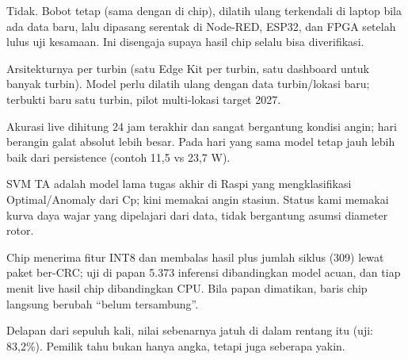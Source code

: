 \documentclass[10.5pt,a4paper]{article}
\begin{document}
\begin{jawab}
Tidak. Bobot tetap (sama dengan di chip), dilatih ulang terkendali di laptop bila ada data baru, lalu dipasang serentak di Node-RED, ESP32, dan FPGA
setelah lulus uji kesamaan. Ini disengaja supaya hasil chip selalu bisa diverifikasi.
\end{jawab}
\begin{jawab}
Arsitekturnya per turbin (satu Edge Kit per turbin, satu dashboard untuk banyak turbin). Model perlu dilatih ulang dengan data turbin/lokasi
baru; terbukti baru satu turbin, pilot multi-lokasi target 2027.
\end{jawab}
\begin{jawab}
Akurasi live dihitung 24 jam terakhir dan sangat bergantung kondisi angin; hari berangin galat absolut lebih besar. Pada hari yang sama model
tetap jauh lebih baik dari persistence (contoh 11,5 vs 23,7 W).
\end{jawab}
\begin{jawab}
SVM TA adalah model lama tugas akhir di Raspi yang mengklasifikasi Optimal/Anomaly dari Cp; kini memakai angin stasiun. Status kami
memakai kurva daya wajar yang dipelajari dari data, tidak bergantung asumsi diameter rotor.
\end{jawab}
\begin{jawab}
Chip menerima fitur INT8 dan membalas hasil plus jumlah siklus (309) lewat paket ber-CRC; uji di papan 5.373 inferensi dibandingkan model acuan,
dan tiap menit live hasil chip dibandingkan CPU. Bila papan dimatikan, baris chip langsung berubah ``belum tersambung''.
\end{jawab}
\begin{jawab}
Delapan dari sepuluh kali, nilai sebenarnya jatuh di dalam rentang itu (uji: 83,2\%). Pemilik tahu bukan hanya angka, tetapi juga seberapa yakin.
\end{jawab}
\end{document}
